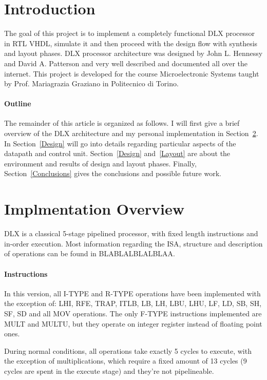 \documentclass[12pt]{article}
\begin{document}
\maketitle


\section{Introduction}
The goal of this project is to implement a completely functional DLX processor in RTL VHDL, simulate it and then proceed with the design flow with synthesis and layout phases.
DLX processor architecture was designed by John L. Hennessy and David A. Patterson and very well described and documented all over the internet.
This project is developed for the course Microelectronic Systems taught by Prof. Mariagrazia Graziano in Politecnico di Torino.



\paragraph{Outline}
The remainder of this article is organized as follows. 
I will first give a brief overview of the DLX architecture and my personal implementation in Section~\ref{Overview}.
In Section~\ref{Design} will go into details regarding particular aspects of the datapath and control unit.
Section~\ref{Design} and~\ref{Layout} are about the environment and results of design and layout phases.
Finally, Section~\ref{Conclusions} gives the conclusions and possible future work.

\section{Implmentation Overview}\label{Overview}
DLX is a classical 5-stage pipelined processor, with fixed length instructions and in-order execution.
Most information regarding the ISA, structure and description of operations can be found in BLABLALBLALBLAA.
\paragraph{Instructions}
In this version, all I-TYPE and R-TYPE operations have been implemented with the exception of: LHI, RFE, TRAP, ITLB, LB, LH, LBU, LHU, LF, LD, SB, SH, SF, SD and all MOV operations.
The only F-TYPE instructions implemented are MULT and MULTU, but they operate on integer register instead of floating point ones.

During normal conditions, all operations take exactly 5 cycles to execute, with the exception of multiplications, which require a fixed amount of 13 cycles (9 cycles are spent in the execute stage) and they're not pipelineable.
\end{document}
